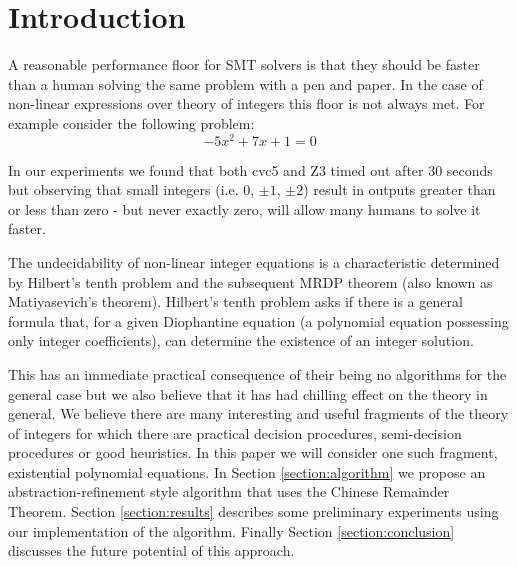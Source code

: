 \section{Introduction}


A reasonable performance floor for SMT solvers is that they should be
faster than a human solving the same problem with a pen and paper.
%
In the case of non-linear expressions over theory of integers this
floor is not always met.
%
For example consider the following problem: 
\[-5x^2 + 7x + 1 = 0\]

In our experiments we found that both cvc5 and Z3 timed out after 30 
seconds but observing that small integers (i.e. $0$, $\pm 1$, $\pm 2$)
result in outputs greater than or less than zero - but never exactly
zero, will allow many humans to solve it faster.

The undecidability of non-linear integer equations is a characteristic
determined by Hilbert's tenth problem and the subsequent MRDP theorem 
(also known as Matiyasevich's theorem). Hilbert's tenth problem asks 
if there is a general formula that, for a given Diophantine equation 
(a polynomial equation possessing only integer coefficients), can 
determine the existence of an integer solution.

This has an immediate practical consequence of their being no
algorithms for the general case but we also believe that it has had
chilling effect on the theory in general.
%
We believe there are many interesting and useful fragments of the
theory of integers for which there are practical decision procedures,
semi-decision procedures or good heuristics.
In this paper we will consider one such fragment, existential
polynomial equations.
%
In Section \ref{section:algorithm} we propose an
abstraction-refinement style algorithm that uses the Chinese Remainder
Theorem.
Section \ref{section:results} describes some preliminary experiments
using our implementation of the algorithm.
Finally Section \ref{section:conclusion} discusses the future
potential of this approach.

